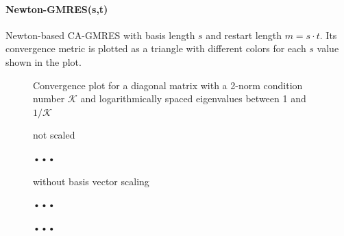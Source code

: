 \documentclass{scrartcl}
\numberwithin{equation}{section}
\begin{document}
\paragraph{Newton-GMRES(s,t)} Newton-based CA-GMRES with basis length $s$ and restart length $m = s \cdot t$. Its convergence metric is plotted as a triangle with different colors for each $s$ value shown in the plot.

\begin{figure}
	\centering
	\resizebox{.9\textwidth}{!}{}	
	\caption{Convergence plot for a diagonal matrix with a 2-norm condition number $\mathcal{K}$ and logarithmically spaced eigenvalues between 1 and $1/\mathcal{K}$}
	\label{fig:dmat3}
\end{figure}

\begin{figure}
	\centering
	\resizebox{.9\textwidth}{!}{}
	\caption{not scaled}
	\label{fig:watt1_noscale}
\end{figure}
\begin{figure}
	\centering
	\resizebox{.9\textwidth}{!}{}
	\caption{•••}
	\label{fig:watt1_scale}
\end{figure}
\begin{figure}
	\centering
	\resizebox{.9\textwidth}{!}{}
	\caption{without basis vector scaling}
	\label{fig:watt1_ilu0}
\end{figure}
\begin{figure}
	\centering
	\resizebox{.9\textwidth}{!}{}
	\caption{•••}
	\label{fig:bmw7st1}
\end{figure}

\begin{figure}
	\centering
	\resizebox{.9\textwidth}{!}{}
	\caption{•••}
	\label{fig:xenon2}
\end{figure}
\end{document}
